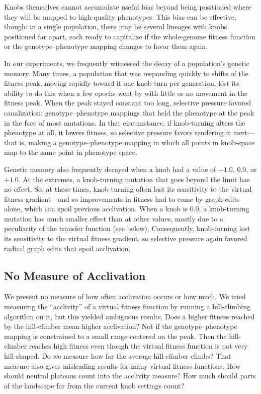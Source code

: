 \documentclass[letterpaper]{article}
\begin{document}
Knobs themselves cannot accumulate useful bias beyond being positioned where
they will be mapped to high-quality phenotypes. This bias can be effective,
though: in a single population, there may be several lineages with knobs
positioned far apart, each ready to capitalize if the whole-genome fitness
function or the genotype--phenotype mapping changes to favor them again.

In our experiments, we frequently witnessed the decay of a population's genetic
memory. Many times, a population that was responding quickly to shifts of the
fitness peak, moving rapidly toward it one knob-turn per generation, lost its
ability to do this when a few epochs went by with little or no movement in the
fitness peak. When the peak stayed constant too long, selective pressure
favored canalization: genotype--phenotype mappings that held the phenotype at
the peak in the face of most mutations. In that circumstance, if knob-turning
alters the phenotype at all, it lowers fitness, so selective pressure favors
rendering it inert---that is, making a genotype--phenotype mapping in which all
points in knob-space map to the same point in phenotype space.

Genetic memory also frequently decayed when a knob had a value of $-1.0$,
$0.0$, or $+1.0$. At the extremes, a knob-turning mutation that goes beyond the
limit has no effect. So, at these times, knob-turning often lost its
sensitivity to the virtual fitness gradient---and so improvements in fitness
had to come by graph-edits alone, which can spoil previous acclivation. When a
knob is 0.0, a knob-turning mutation has much smaller effect than at other
values, mostly due to a peculiarity of the transfer function (see below).
Consequently, knob-turning lost its sensitivity to the virtual fitness
gradient, so selective pressure again favored radical graph edits that spoil
acclivation.

\subsection{No Measure of Acclivation}

We present no measure of how often acclivation occurs or how much. We tried
measuring the ``acclivity'' of a virtual fitness function by running a
hill-climbing algorithm on it, but this yielded ambiguous results. Does a
higher fitness reached by the hill-climber mean higher acclivation? Not if the
genotype--phenotype mapping is constrained to a small range centered on the
peak. Then the hill-climber reaches high fitness even though the virtual
fitness function is not very hill-shaped. Do we measure how far the average
hill-climber climbs?  That measure also gives misleading results for many
virtual fitness functions. How should neutral plateaus count into the acclivity
measure? How much should parts of the landscape far from the current knob
settings count?
\end{document}
